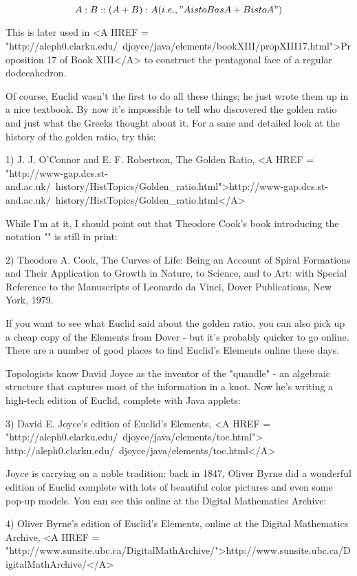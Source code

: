 $$

A:B::(A+B):A                (i.e., "A is to B as A+B is to A")
$$
    
This is later used in 
<A HREF = "http://aleph0.clarku.edu/~djoyce/java/elements/bookXIII/propXIII17.html">Proposition 17 of Book XIII</A> to construct
the pentagonal face of a regular dodecahedron.  

Of course, Euclid wasn't the first to do all these things; he just wrote
them up in a nice textbook.  By now it's impossible to tell who discovered
the golden ratio and just what the Greeks thought about it.  For a sane
and detailed look at the history of the golden ratio, try this:

1) J. J. O'Connor and E. F. Robertson, The Golden Ratio,
<A HREF = "http://www-gap.dcs.st-and.ac.uk/~history/HistTopics/Golden_ratio.html">http://www-gap.dcs.st-and.ac.uk/~history/HistTopics/Golden_ratio.html</A>

While I'm at it, I should point out that Theodore Cook's
book introducing the notation "\Phi " is still in print: 

2) Theodore A. Cook, The Curves of Life:
Being an Account of Spiral Formations and Their Application to Growth in 
Nature, to Science, and to Art: with Special Reference to the Manuscripts 
of Leonardo da Vinci, Dover Publications, New
York, 1979.

If you want to see what Euclid said about the golden ratio, you can
also pick up a cheap copy of the Elements from Dover - but it's probably 
quicker to go online.  There are a number of good places to find Euclid's 
Elements online these days.  

Topologists know David Joyce as the inventor of the "quandle" - an 
algebraic structure that captures most of the information in a knot. 
Now he's writing a high-tech edition of Euclid, complete with Java applets: 

3) David E. Joyce's edition of Euclid's Elements,
<A HREF = "http://aleph0.clarku.edu/~djoyce/java/elements/toc.html">
http://aleph0.clarku.edu/~djoyce/java/elements/toc.html</A>

Joyce is carrying on a noble tradition: back in 1847, Oliver Byrne did 
a wonderful edition of Euclid complete with lots of beautiful color 
pictures and even some pop-up models.  You can see this online at
the Digital Mathematics Archive:

4) Oliver Byrne's edition of Euclid's Elements, online at the Digital 
Mathematics Archive, <A HREF = "http://www.sunsite.ubc.ca/DigitalMathArchive/">http://www.sunsite.ubc.ca/DigitalMathArchive/</A>

